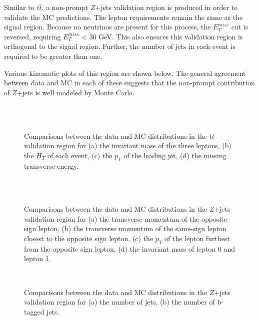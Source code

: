 Similar to $t\bar{t}$, a non-prompt $Z$+jets validation region is produced in order to validate the MC predictions. The lepton requirements remain the same as the signal region. Because no neutrinos are present for this process, the $E_T^{miss}$ cut is reversed, requiring $E_T^{miss}$ < 30 GeV. This also ensures this validation region is orthogonal to the signal region. Further, the number of jets in each event is required to be greater than one. 

Various kinematic plots of this region are shown below. The general agreement between data and MC in each of these suggests that the non-prompt contribution of $Z$+jets is well modeled by Monte Carlo.

\begin{figure}[H]
    \\
    \\
    \caption{Comparisons between the data and MC distributions in the $t\bar{t}$ validation region for (a) the invariant mass of the three leptons, (b) the $H_T$ of each event, (c) the $p_T$ of the leading jet, (d) the missing transverse energy.}    
    \end{figure}
\begin{figure}[H]
    \\
    \\
    \caption{Comparisons between the data and MC distributions in the $Z$+jets validation region for (a) the transverse momentum of the opposite sign lepton, (b) the transverse momentum of the same-sign lepton closest to the opposite sign lepton, (c) the $p_T$ of the lepton furthest from the opposite sign lepton, (d) the invariant mass of lepton 0 and lepton 1.}
\end{figure}
\begin{figure}[H]
    \\
    \caption{Comparisons between the data and MC distributions in the $Z$+jets validation region for (a) the number of jets, (b) the number of b-tagged jets.}
    \label{zjets_kinematics}
\end{figure}

